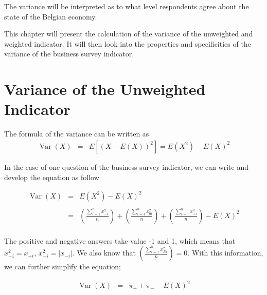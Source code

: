 \documentclass[12pt,a4paper,oneside]{book}
\DeclareMathOperator{\Var}{Var}
\begin{document}
The variance will be interpreted as to what level respondents agree about the state of the Belgian economy.


This chapter will present the calculation of the variance of the unweighted and weighted indicator.
It will then look into the properties and specificities of the variance of the business survey indicator.



\section{Variance of the Unweighted Indicator}


\nocite{alcaniz_calculation_2006}

The formula of the variance can be written as 
\begin{eqnarray}
         \Var(X) &=& E \left[ \left(X-E(X) \right)^2 \right] =  E\left( X^2\right) - E\left( X\right)^2
\end{eqnarray}

In the case of one question of the business survey indicator, we can write and develop the equation as follow

\begin{eqnarray}
\Var(X) &=&  E\left( X^2\right) - E\left( X\right)^2 \nonumber \\ \nonumber \\
    &=& \left( \frac{\sum_{i=1}^n x_{-i}^2}{n} \right) + \left( \frac{\sum_{i=1}^n x_{0i}^2}{n} \right) + \left( \frac{\sum_{i=1}^n x_{+i}^2}{n} \right) - E(X)^2 \\ \nonumber 
\end{eqnarray}


The positive and negative answers take value -1 and 1, which means that $x_{+i}^2 = x_{+i}$, $x_{-i}^2 = |x_{-i}|$. We also know that $\left( \frac{\sum_{i=1}^n x_{Ni}^2}{n} \right) = 0$. 
With this information, we can further simplify the equation;

\begin{eqnarray}
\Var(X) &=& \pi_+ + \pi_- - E ( X )^2 \label{var1} \\ \nonumber
\end{eqnarray}
\end{document}
